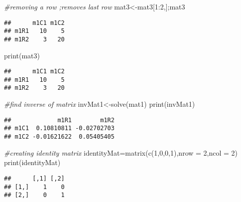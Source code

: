 \documentclass[
]{article}
\newenvironment{Shaded}{\begin{snugshade}}{\end{snugshade}}
\newcommand{\AttributeTok}[1]{\textcolor[rgb]{0.77,0.63,0.00}{#1}}
\newcommand{\CommentTok}[1]{\textcolor[rgb]{0.56,0.35,0.01}{\textit{#1}}}
\newcommand{\DecValTok}[1]{\textcolor[rgb]{0.00,0.00,0.81}{#1}}
\newcommand{\FunctionTok}[1]{\textcolor[rgb]{0.00,0.00,0.00}{#1}}
\newcommand{\NormalTok}[1]{#1}
\newcommand{\OtherTok}[1]{\textcolor[rgb]{0.56,0.35,0.01}{#1}}
\newcommand{\SpecialCharTok}[1]{\textcolor[rgb]{0.00,0.00,0.00}{#1}}
\begin{document}
\begin{Shaded}
\begin{Highlighting}[]
\CommentTok{\#removing a row ;removes last row }
\NormalTok{mat3}\OtherTok{\textless{}{-}}\NormalTok{mat3[}\DecValTok{1}\SpecialCharTok{:}\DecValTok{2}\NormalTok{,];mat3}
\end{Highlighting}
\end{Shaded}

\begin{verbatim}
##      m1C1 m1C2
## m1R1   10    5
## m1R2    3   20
\end{verbatim}

\begin{Shaded}
\begin{Highlighting}[]
\FunctionTok{print}\NormalTok{(mat3)}
\end{Highlighting}
\end{Shaded}

\begin{verbatim}
##      m1C1 m1C2
## m1R1   10    5
## m1R2    3   20
\end{verbatim}

\begin{Shaded}
\begin{Highlighting}[]
\CommentTok{\#find inverse of matrix}
\NormalTok{invMat1}\OtherTok{\textless{}{-}}\FunctionTok{solve}\NormalTok{(mat1)}
\FunctionTok{print}\NormalTok{(invMat1)}
\end{Highlighting}
\end{Shaded}

\begin{verbatim}
##             m1R1        m1R2
## m1C1  0.10810811 -0.02702703
## m1C2 -0.01621622  0.05405405
\end{verbatim}

\begin{Shaded}
\begin{Highlighting}[]
\CommentTok{\#creating identity matrix}
\NormalTok{identityMat}\OtherTok{=}\FunctionTok{matrix}\NormalTok{(}\FunctionTok{c}\NormalTok{(}\DecValTok{1}\NormalTok{,}\DecValTok{0}\NormalTok{,}\DecValTok{0}\NormalTok{,}\DecValTok{1}\NormalTok{),}\AttributeTok{nrow =} \DecValTok{2}\NormalTok{,}\AttributeTok{ncol =} \DecValTok{2}\NormalTok{)}
\FunctionTok{print}\NormalTok{(identityMat)}
\end{Highlighting}
\end{Shaded}

\begin{verbatim}
##      [,1] [,2]
## [1,]    1    0
## [2,]    0    1
\end{verbatim}
\end{document}

